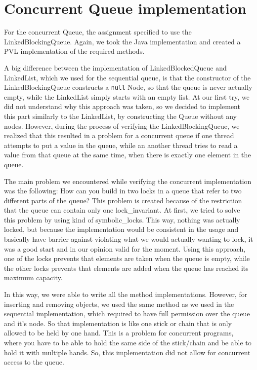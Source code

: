 \section{Concurrent Queue implementation}
For the concurrent Queue, the assignment specified to use the LinkedBlockingQueue. Again, we took the Java implementation and created a PVL implementation of the required methods.

A big difference between the implementation of LinkedBlockedQueue and LinkedList, which we used for the sequential queue, is that the constructor of the LinkedBlockingQueue constructs a {\tt null} Node, so that the queue is never actually empty, while the LinkedList simply starts with an empty list. At our first try, we did not understand why this approach was taken, so we decided to implement this part similarly to the LinkedList, by constructing the Queue without any nodes. However, during the process of verifying the LinkedBlockingQueue, we realized that this resulted in a problem for a concurrent queue if one thread attempts to put a value in the queue, while an another thread tries to read a value from that queue at the same time, when there is exactly one element in the queue.

The main problem we encountered while verifying the concurrent implementation was the following:
How can you build in two locks in a queue that refer to two different parts of the queue? This problem is created because of the restriction that the queue can contain only one lock\_invariant. At first, we tried to solve this problem by using kind of symbolic\_locks. This way, nothing was actually locked, but because the implementation would be consistent in the usage and basically have barrier against violating what we would actually wanting to lock, it was a good start and in our opinion valid for the moment. Using this approach, one of the locks prevents that elements are taken when the queue is empty, while the other locks prevents that elements are added when the queue has reached its maximum capacity.

In this way, we were able to write all the method implementations. However, for inserting and removing objects, we used the same method as we used in the sequential implementation, which required to have full permission over the queue and it's node. So that implementation is like one stick or chain that is only allowed to be held by one hand. This is a problem for concurrent programs, where you have to be able to hold the same side of the stick/chain and be able to hold it with multiple hands. So, this implementation did not allow for concurrent access to the queue.

